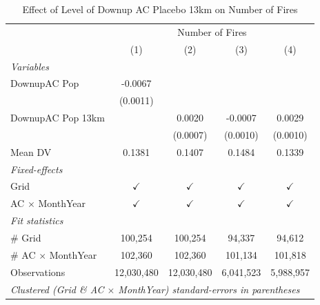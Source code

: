 
\begin{table}[htbp]
   \caption{\label{tab:protest_treat_main} Effect of Level of Downup AC Placebo 13km on Number of Fires}
   \centering
   \begin{tabular}{lcccc}
      \tabularnewline \midrule \midrule
       & \multicolumn{4}{c}{Number of Fires}\\
                                 & (1)           & (2)           & (3)           & (4)\\  
      \midrule
      \emph{Variables}\\
      DownupAC Pop               & -0.0067       &               &               &   \\   
                                 & (0.0011)      &               &               &   \\   
      DownupAC Pop 13km          &               & 0.0020        & -0.0007       & 0.0029\\   
                                 &               & (0.0007)      & (0.0010)      & (0.0010)\\   
      \hline Mean DV             & 0.1381        & 0.1407        & 0.1484        & 0.1339\\  
      \midrule
      \emph{Fixed-effects}\\
      Grid                       & $\checkmark$  & $\checkmark$  & $\checkmark$  & $\checkmark$\\   
      AC $\times$ MonthYear      & $\checkmark$  & $\checkmark$  & $\checkmark$  & $\checkmark$\\   
      \midrule
      \emph{Fit statistics}\\
      \# Grid                    & 100,254       & 100,254       & 94,337        & 94,612\\  
      \# AC $\times$ MonthYear   & 102,360       & 102,360       & 101,134       & 101,818\\  
      Observations               & 12,030,480    & 12,030,480    & 6,041,523     & 5,988,957\\  
      \midrule \midrule
      \multicolumn{5}{l}{\emph{Clustered (Grid \& AC $\times$ MonthYear) standard-errors in parentheses}}\\
   \end{tabular}
\end{table}


